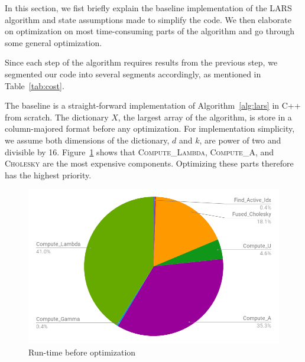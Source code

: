 
In this section, we fist briefly explain the baseline implementation of the LARS algorithm and state assumptions made to simplify the code. 
We then elaborate on optimization on most time-consuming parts of the algorithm and go through some general optimization.



Since each step of the algorithm requires results from the previous step, we segmented our code into several segments accordingly, as mentioned in Table~\ref{tab:cost}.

The baseline is a straight-forward implementation of Algorithm~\ref{alg:lars} in C++ from scratch. The dictionary $X$, the largest array of the algorithm, is store in a column-majored format before any optimization. For implementation simplicity, we assume both dimensions of the dictionary, $d$ and $k$, are power of two and divisible by 16. Figure~\ref{fig:pie_before} shows that \textsc{Compute\_Lambda}, \textsc{Compute\_A}, and \textsc{Cholesky} are the most expensive components. Optimizing these parts therefore has the highest priority. 

\begin{figure}
\centering
  \includegraphics[scale=0.29]{./pic/pie_before.png}
  \caption{Run-time before optimization}
  \label{fig:pie_before}
\end{figure}

